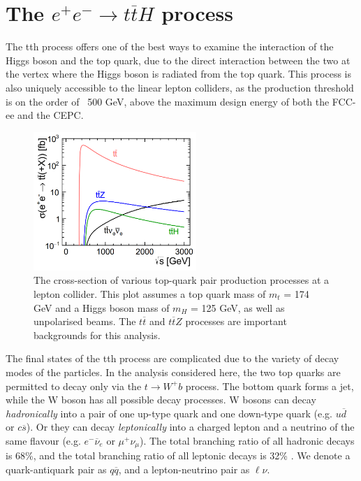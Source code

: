 \section{The $e^+ e^- \rightarrow t\overline{t}H$ process}
The tth process offers one of the best ways to examine the interaction of the Higgs boson and the top quark, due to the direct interaction between the two at the vertex where the Higgs boson is radiated from the top quark. This process is also uniquely accessible to the linear lepton colliders, as the production threshold is on the order of ~500 GeV, above the maximum design energy of both the \acrshort{FCC}-ee and the \acrshort{CEPC}.

\begin{figure}[h]
	\centering
	\includegraphics[width=0.55\textwidth]{../Pictures/Analysis/tt-production-crosssection.png}
	\caption{The cross-section of various top-quark pair production processes at a lepton collider. This plot assumes a top quark mass of $m_t$ = 174 GeV and a Higgs boson mass of $m_H$ = 125 GeV, as well as unpolarised beams. The $t\overline{t}$ and $t\overline{t}Z$ processes are important backgrounds for this analysis. }
	\label{figure:analysis/top-quark-plot}
\end{figure}

The final states of the tth process are complicated due to the variety of decay modes of the particles. In the analysis considered here, the two top quarks are permitted to decay only via the $t \rightarrow W^+ b $ process. The bottom quark forms a jet, while the W boson has all possible decay processes. W bosons can decay \textit{hadronically} into a pair of one up-type quark and one down-type quark (e.g. $u\overline{d}$ or $c\overline{s}$). Or they can decay \textit{leptonically} into a charged lepton and a neutrino of the same flavour (e.g. $e^- \overline{\nu}_e$ or $\mu^+ \nu_\mu$). The total branching ratio of all hadronic decays is 68\%, and the total branching ratio of all leptonic decays is 32\% \cite{pdg-review}. We denote a quark-antiquark pair as $q\overline{q}$, and a lepton-neutrino pair as $\ell \nu$.

